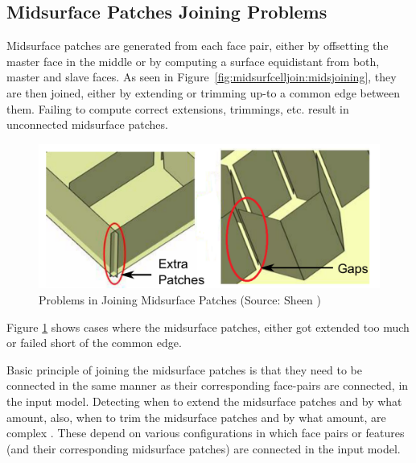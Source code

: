  
\subsection{Midsurface Patches Joining Problems} \label{sec:midsurfcelljoin:facepairinteraction}

Midsurface patches are generated from each face pair, either by offsetting the master face in the middle or by computing a surface equidistant from both, master and slave faces. As seen in Figure~\ref{fig:midsurfcelljoin:midsjoining}, they are then joined, either by extending or trimming up-to a common edge between them. Failing to compute correct extensions, trimmings, etc. result in unconnected midsurface patches.

\begin{figure}[h!]
	\centering 
	\includegraphics[width=0.62\linewidth]{../Common/images/patchjoiningproblems.pdf}
	\caption{Problems in Joining Midsurface Patches (Source: Sheen \cite{Sheen2005}) }
	\label{fig:midsurfcelljoin:patchjoiningproblems}
	\end{figure}
	
Figure \ref{fig:midsurfcelljoin:patchjoiningproblems} shows cases where the midsurface patches, either got extended too much or failed short of the common edge. 


Basic principle of joining the midsurface patches is that they need to be connected in the same manner as their corresponding face-pairs are connected, in the input model. Detecting when to extend the midsurface patches and by what amount, also, when to trim the midsurface patches and by what amount, are complex . These depend on various configurations in which face pairs or features (and their corresponding midsurface patches) are connected in the input model.


